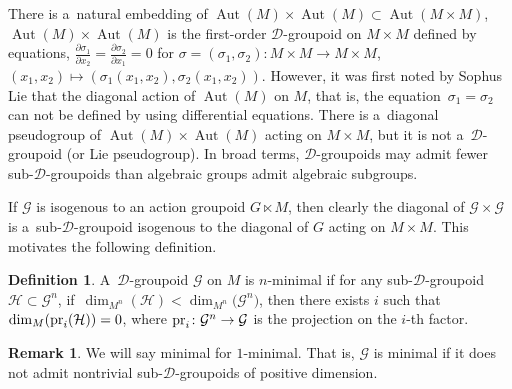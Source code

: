 \documentclass[10pt,a4paper]{amsart}
\numberwithin{equation}{section}
\theoremstyle{definition}
\newtheorem{Definition}[Theorem]{Definition}
\newtheorem{Remark}[Theorem]{Remark}
\begin{document}
There is a~natural embedding of $\operatorname{Aut}(M)\times\operatorname{Aut}(M) \subset \operatorname{Aut}(M\times M)$,
$\operatorname{Aut}(M)\times \operatorname{Aut}(M)$ is the first-order $\mathcal D$-groupoid on $M\times M$ defined by equations,
$\frac{\partial \sigma_1}{\partial x_2}= \frac{\partial \sigma_2}{\partial x_1} = 0$
for $\sigma = (\sigma_1,\sigma_2) \colon M\times M \to M\times M$, $(x_1,x_2) \mapsto (\sigma_1(x_1,x_2),\sigma_2(x_1,x_2))$. However, it was first noted by Sophus Lie that the diagonal action of $\operatorname{Aut}(M)$ on $M$, that is, the equation~${\sigma_1 = \sigma_2}$ can not be defined by using differential equations. There is a~diagonal pseudogroup of $\operatorname{Aut}(M)\times \operatorname{Aut}(M)$ acting on $M\times M$, but it is not a~$\mathcal D$-groupoid (or Lie pseudogroup). In broad terms, $\mathcal D$-groupoids may admit fewer sub-$\mathcal D$-groupoids than algebraic groups admit algebraic subgroups.

If $\mathcal G$ is isogenous to an action groupoid $G\ltimes M$, then clearly the diagonal of $\mathcal G\times \mathcal G$ is a~sub-$\mathcal D$-groupoid isogenous to the diagonal of $G$ acting on $M\times M$. This motivates the following definition.

\begin{Definition}\label{def_minimal}
 A~$\mathcal D$-groupoid $\mathcal G$ on $M$ is $n$-minimal if for any sub-$\mathcal D$-groupoid $\mathcal H \subset \mathcal G^n$, if~${\dim_{M^n} (\mathcal H)< \dim_{M^n}\bigl(\mathcal G^n\bigr)}$, then there exists $i$ such that $\dim_M({\rm pr}_i(\mathcal H)) =0$, where ${\rm pr}_i \colon \mathcal G^n \to \mathcal G$ is the projection on the $i$-th factor.
\end{Definition}

\begin{Remark}
 We will say minimal for $1$-minimal. That is, $\mathcal G$ is minimal if it does not admit nontrivial sub-$\mathcal D$-groupoids of positive dimension.
\end{Remark}
\end{document}
